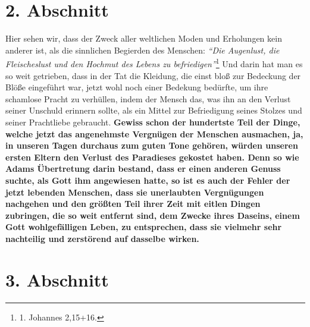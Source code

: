 \section{2. Abschnitt} \label{kap17_ab2}

Hier sehen wir, dass der Zweck aller weltlichen Moden und Erholungen kein
anderer ist, als die sinnlichen Begierden des Menschen:
\textit{"`Die Augenlust, die
Fleischeslust und den Hochmut des Lebens zu befriedigen"'}\footnote{1. Johannes
2,15+16.}
Und darin hat man es so weit getrieben, dass in der Tat die Kleidung, die
einst bloß zur Bedeckung der Blöße eingeführt war, jetzt wohl noch einer
Bedekung bedürfte, um ihre schamlose Pracht zu verhüllen, indem der Mensch das,
was ihn an den Verlust seiner Unschuld erinnern sollte, als ein Mittel zur
Befriedigung seines Stolzes und seiner Prachtliebe gebraucht.
\label{ref:17_02_adam_und_eva}
\textbf{Gewiss schon der
hundertste Teil der Dinge, welche jetzt das angenehmste Vergnügen der Menschen
ausmachen, ja, in unseren Tagen durchaus zum guten Tone gehören, würden unseren
ersten Eltern den Verlust des Paradieses gekostet haben. Denn so wie
Adams
Übertretung darin bestand, dass er einen anderen Genuss suchte, als Gott ihm
angewiesen hatte, so ist es auch der Fehler der jetzt lebenden Menschen, dass
sie
unerlaubten Vergnügungen nachgehen und den größten Teil ihrer Zeit mit eitlen
Dingen zubringen, die so weit entfernt sind, dem Zwecke ihres Daseins, einem
Gott wohlgefälligen Leben, zu entsprechen, dass sie vielmehr sehr nachteilig und
zerstörend auf dasselbe wirken.}

\section{3. Abschnitt} \label{kap17_ab3}

